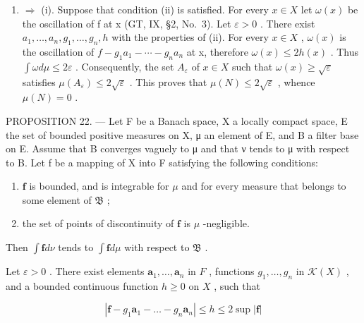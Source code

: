 \begin{enumerate}
\def\labelenumi{(\roman{enumi})}
\setcounter{enumi}{1}
\tightlist
\item
  \(\Rightarrow\) (i). Suppose that condition (ii) is satisfied. For every \(x \in X\) let \(\omega(x)\) be the oscillation of f at x (GT, IX, §2, No.~3). Let \(\varepsilon > 0\) . There exist \(a_{1}, \ldots, a_{n}, g_{1}, \ldots, g_{n}, h\) with the properties of (ii). For every \(x \in X\) , \(\omega(x)\) is the oscillation of \(f - g_{1}a_{1} - \cdots - g_{n}a_{n}\) at x, therefore \(\omega(x) \leqslant 2h(x)\) . Thus \(\int \omega d\mu \leqslant 2\varepsilon\) . Consequently, the set \(A_{\varepsilon}\) of \(x \in X\) such that \(\omega(x) \geqslant \sqrt{\varepsilon}\) satisfies \(\mu(A_{\varepsilon}) \leqslant 2\sqrt{\varepsilon}\) . This proves that \(\mu(N) \leqslant 2\sqrt{\varepsilon}\) , whence \(\mu(N) = 0\) .
\end{enumerate}

PROPOSITION 22. --- Let F be a Banach space, X a locally compact space, E the set of bounded positive measures on X, μ an element of E, and B a filter base on E. Assume that B converges vaguely to μ and that \textbar\textbar ν\textbar\textbar{} tends to \textbar\textbar μ\textbar\textbar{} with respect to B. Let f be a mapping of X into F satisfying the following conditions:

\begin{enumerate}
\def\labelenumi{(\roman{enumi})}
\item
  \(\mathbf{f}\) is bounded, and is integrable for \(\mu\) and for every measure that belongs to some element of \(\mathfrak{B}\) ;
\item
  the set of points of discontinuity of \(\mathbf{f}\) is \(\mu\) -negligible.
\end{enumerate}

Then \(\int \mathbf{f}d\nu\) tends to \(\int \mathbf{f}d\mu\) with respect to \(\mathfrak{B}\) .

Let \(\varepsilon > 0\) . There exist elements \(\mathbf{a}_1, \ldots, \mathbf{a}_n\) in \(F\) , functions \(g_1, \ldots, g_n\) in \(\mathcal{K}(X)\) , and a bounded continuous function \(h \geqslant 0\) on \(X\) , such that

\[
\left| \mathbf {f} - g _ {1} \mathbf {a} _ {1} - \dots - g _ {n} \mathbf {a} _ {n} \right| \leqslant h \leqslant 2 \sup | \mathbf {f} |
\]

